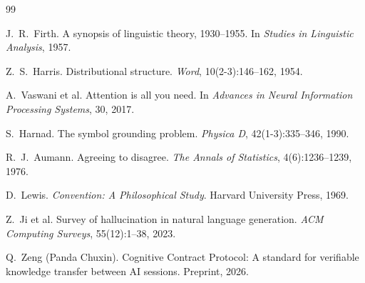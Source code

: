 \documentclass[11pt,a4paper]{article}
\begin{document}
\begin{thebibliography}{99}

J.~R.~Firth.
\newblock A synopsis of linguistic theory, 1930--1955.
\newblock In \emph{Studies in Linguistic Analysis}, 1957.

Z.~S.~Harris.
\newblock Distributional structure.
\newblock \emph{Word}, 10(2-3):146--162, 1954.

A.~Vaswani et al.
\newblock Attention is all you need.
\newblock In \emph{Advances in Neural Information Processing Systems}, 30, 2017.

S.~Harnad.
\newblock The symbol grounding problem.
\newblock \emph{Physica D}, 42(1-3):335--346, 1990.

R.~J.~Aumann.
\newblock Agreeing to disagree.
\newblock \emph{The Annals of Statistics}, 4(6):1236--1239, 1976.

D.~Lewis.
\newblock \emph{Convention: A Philosophical Study}.
\newblock Harvard University Press, 1969.

Z.~Ji et al.
\newblock Survey of hallucination in natural language generation.
\newblock \emph{ACM Computing Surveys}, 55(12):1--38, 2023.

Q.~Zeng (Panda Chuxin).
\newblock Cognitive Contract Protocol: A standard for verifiable knowledge transfer between AI sessions.
\newblock Preprint, 2026.

\end{thebibliography}
\end{document}

